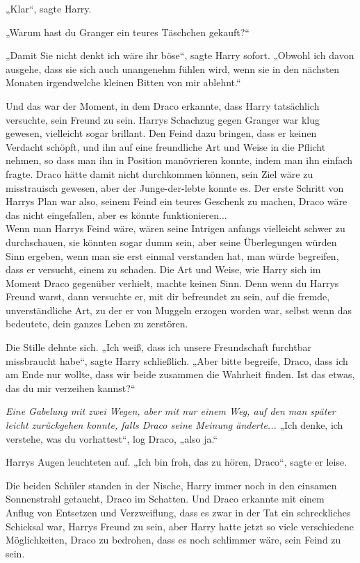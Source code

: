 {„Klar“, sagte Harry.

„Warum hast du Granger ein teures Täschchen gekauft?“

„Damit Sie nicht denkt ich wäre ihr böse“, sagte Harry sofort. „Obwohl ich davon ausgehe, dass sie sich auch unangenehm fühlen wird, wenn sie in den nächsten Monaten irgendwelche kleinen Bitten von mir ablehnt.“

Und das war der Moment, in dem Draco erkannte, dass Harry tatsächlich versuchte, sein Freund zu sein. Harrys Schachzug gegen Granger war klug gewesen, vielleicht sogar brillant. Den Feind dazu bringen, dass er keinen Verdacht schöpft, und ihn auf eine freundliche Art und Weise in die Pflicht nehmen, so dass man ihn in Position manövrieren konnte, indem man ihn einfach fragte. Draco hätte damit nicht durchkommen können, sein Ziel wäre zu misstrauisch gewesen, aber der Junge-der-lebte konnte es. Der erste Schritt von Harrys Plan war also, seinem Feind ein teures Geschenk zu machen, Draco wäre das nicht eingefallen, aber es könnte funktionieren...\\ Wenn man Harrys Feind wäre, wären seine Intrigen anfangs vielleicht schwer zu durchschauen, sie könnten sogar dumm sein, aber seine Überlegungen würden Sinn ergeben, wenn man sie erst einmal verstanden hat, man würde begreifen, dass er versucht, einem zu schaden. Die Art und Weise, wie Harry sich im Moment Draco gegenüber verhielt, machte keinen Sinn. Denn wenn du Harrys Freund warst, dann versuchte er, mit dir befreundet zu sein, auf die fremde, unverständliche Art, zu der er von Muggeln erzogen worden war, selbst wenn das bedeutete, dein ganzes Leben zu zerstören.

Die Stille dehnte sich. „Ich weiß, dass ich unsere Freundschaft furchtbar missbraucht habe“, sagte Harry schließlich. „Aber bitte begreife, Draco, dass ich am Ende nur wollte, dass wir beide zusammen die Wahrheit finden. Ist das etwas, das du mir verzeihen kannst?“

\emph{Eine Gabelung mit zwei Wegen, aber mit nur einem Weg, auf den man später leicht zurückgehen konnte, falls Draco seine Meinung änderte...} „Ich denke, ich verstehe, was du vorhattest“, log Draco, „also ja.“

Harrys Augen leuchteten auf. „Ich bin froh, das zu hören, Draco“, sagte er leise.

Die beiden Schüler standen in der Nische, Harry immer noch in den einsamen Sonnenstrahl getaucht, Draco im Schatten. Und Draco erkannte mit einem Anflug von Entsetzen und Verzweiflung, dass es zwar in der Tat ein schreckliches Schicksal war, Harrys Freund zu sein, aber Harry hatte jetzt so viele verschiedene Möglichkeiten, Draco zu bedrohen, dass es noch schlimmer wäre, sein Feind zu sein.

}
